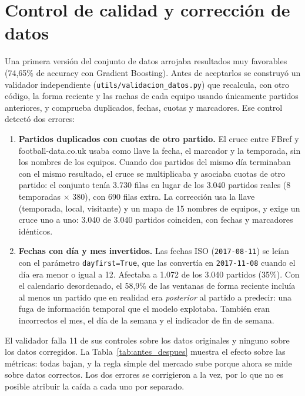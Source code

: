 \documentclass[12pt,letterpaper,oneside]{report}
\begin{document}
\section{Control de calidad y corrección de datos}
\label{sec:calidad}
Una primera versión del conjunto de datos arrojaba resultados muy favorables (74,65\% de accuracy con Gradient Boosting). Antes de aceptarlos se construyó un validador independiente (\texttt{utils/validacion\_datos.py}) que recalcula, con otro código, la forma reciente y las rachas de cada equipo usando únicamente partidos anteriores, y comprueba duplicados, fechas, cuotas y marcadores. Ese control detectó dos errores:
\begin{enumerate}
\item \textbf{Partidos duplicados con cuotas de otro partido.} El cruce entre FBref y football-data.co.uk usaba como llave la fecha, el marcador y la temporada, sin los nombres de los equipos. Cuando dos partidos del mismo día terminaban con el mismo resultado, el cruce se multiplicaba y asociaba cuotas de otro partido: el conjunto tenía 3.730 filas en lugar de los 3.040 partidos reales (8 temporadas $\times$ 380), con 690 filas extra. La corrección usa la llave (temporada, local, visitante) y un mapa de 15 nombres de equipos, y exige un cruce uno a uno: 3.040 de 3.040 partidos coinciden, con fechas y marcadores idénticos.
\item \textbf{Fechas con día y mes invertidos.} Las fechas ISO (\texttt{2017-08-11}) se leían con el parámetro \texttt{dayfirst=True}, que las convertía en \texttt{2017-11-08} cuando el día era menor o igual a 12. Afectaba a 1.072 de los 3.040 partidos (35\%). Con el calendario desordenado, el 58,9\% de las ventanas de forma reciente incluía al menos un partido que en realidad era \textit{posterior} al partido a predecir: una fuga de información temporal que el modelo explotaba. También eran incorrectos el mes, el día de la semana y el indicador de fin de semana.
\end{enumerate}
El validador falla 11 de sus controles sobre los datos originales y ninguno sobre los datos corregidos. La Tabla~\ref{tab:antes_despues} muestra el efecto sobre las métricas: todas bajan, y la regla simple del mercado sube porque ahora se mide sobre datos correctos. Los dos errores se corrigieron a la vez, por lo que no es posible atribuir la caída a cada uno por separado.
\end{document}
